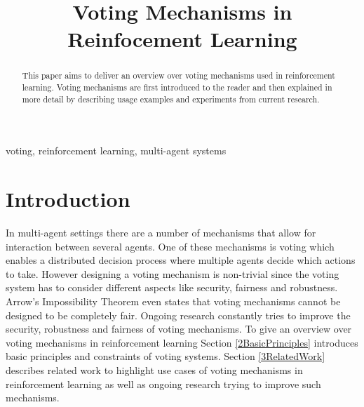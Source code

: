 \documentclass[conference]{IEEEtran}
\begin{document}
\title{Voting Mechanisms in Reinfocement Learning}

\author{
}

\maketitle

\begin{abstract}
This paper aims to deliver an overview over voting mechanisms used in reinforcement learning.
Voting mechanisms are first introduced to the reader and then explained in more detail by
describing usage examples and experiments from current research. 

\end{abstract}

\begin{IEEEkeywords}
voting, reinforcement learning, multi-agent systems
\end{IEEEkeywords}

\section{Introduction}
In multi-agent settings there are a number of mechanisms that allow for interaction between several agents.
One of these mechanisms is voting which enables a distributed decision process where multiple agents decide which actions to take.
\newline
However designing a voting mechanism is non-trivial since the voting system has to consider different aspects like security, fairness and robustness.
Arrow's Impossibility Theorem even states that voting mechanisms cannot be designed to be completely fair.
Ongoing research constantly tries to improve the security, robustness and fairness of voting mechanisms.
\newline
To give an overview over voting mechanisms in reinforcement learning Section \ref{2BasicPrinciples} introduces basic principles and constraints of voting systems.
Section \ref{3RelatedWork} describes related work to highlight use cases of voting mechanisms in reinforcement learning as well as ongoing research trying to improve such mechanisms.
\end{document}
